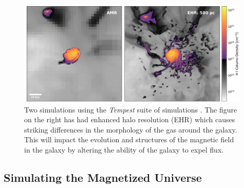 \begin{figure}[t]
\begin{center}
\includegraphics[width=0.99\textwidth]{EHR.png}
\end{center}
\vspace{-6mm}
\caption{\label{fig:ehr} 
Two simulations using the \emph{Tempest} suite of simulations
\citep{Hummels19}. The figure on the right has had enhanced halo resolution
(EHR) which causes striking differences in the morphology of the gas around the galaxy.
This will impact the evolution and structures of the magnetic field in the
galaxy by altering the ability of the galaxy to expel flux.
}
\vspace{-3mm}
\end{figure}
\subsection{Simulating the Magnetized Universe}
\label{sec:simulations}
\vspace{-1mm}

